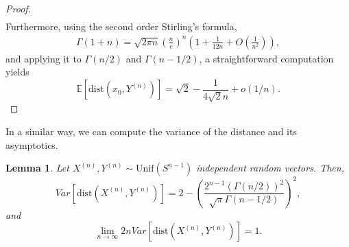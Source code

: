 \documentclass[10pt]{amsart}
\newtheorem{lemma}{Lemma}[section]
\newcounter{theor}
\def\dist{\text{dist}}
\numberwithin{equation}{section}
\begin{document}
\begin{proof}
\begin{align*}
\end{align*}
Furthermore, using the second order Stirling's formula,
\begin{align*}
\Gamma (1+n) = \sqrt{2 \pi n } \left( \frac{n}{e} \right)^n \left( 1 + \frac{1}{12n} + O\left( \frac{1}{n^2} \right) \right),
\end{align*}
and applying it to $\Gamma(n/2)$ and $\Gamma ( n- 1/2 )$, a straightforward computation yields  $$\mathbb{E}[\dist(x_0 , Y^{(n)})] = \sqrt{2} - \frac{1}{4 \sqrt{2}n} + o\left( 1/n \right) .$$
\end{proof}

In a similar way, we can compute the variance of the distance and its asymptotics.
\begin{lemma}
\label{Lem:VarianceHypersphere}
Let $X^{(n)},Y^{(n)} \sim \text{Unif}( S^{n-1})$ independent random vectors. Then, 
$$ Var[\dist(X^{(n)},Y^{(n)})] = 2 - \left( \frac{2^{n-1} \left( \Gamma(n/2) \right)^2}{\sqrt{\pi}\Gamma(n-1/2)} \right)^{2} , $$
and 
$$  \lim _{n \to \infty} 2 n  Var [\dist(X^{(n)} , Y^{(n)})] = 1. $$
\end{lemma}
\end{document}
